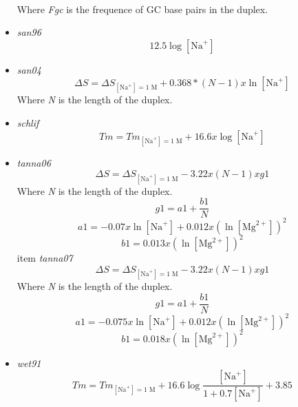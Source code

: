 \documentclass{article}
\begin{document}
\begin{itemize}
\begin{multline*}
 \end{multline*}
 Where \emph{Fgc} is the frequence of GC base pairs in the duplex.
 \item \textit{san96}
 \begin{displaymath}
  12.5  \log [\mbox{Na}^+]   
 \end{displaymath}
 \item \textit{san04}
 \begin{displaymath}
  \Delta{}S=\Delta{}S_{[\mbox{Na}^+]=1\;\mathrm{M}}+ 0.368 * (N - 1) x \ln [\mbox{Na}^+]   
 \end{displaymath}
 Where \emph{N} is the length of the duplex.
 \item \textit{schlif}
 \begin{displaymath}
  Tm=Tm_{[\mbox{Na}^+]=1\;\mathrm{M}}+ 16.6 x \log [\mbox{Na}^+]   
 \end{displaymath}
 \item \textit{tanna06}
 \begin{displaymath}
  \Delta{}S=\Delta{}S_{[\mbox{Na}^+]=1\;\mathrm{M}}- 3.22 x (N - 1) x g1  
 \end{displaymath}
 Where \emph{N} is the length of the duplex.
 \begin{displaymath}
  g1=a1 + \frac{b1}{N}  
 \end{displaymath}
 \begin{displaymath}
  a1= -0.07 x \ln [\mbox{Na}^+] + 0.012 x (\ln [\mbox{Mg}^{2+}])^2  
 \end{displaymath}
 \begin{displaymath}
  b1= 0.013 x (\ln [\mbox{Mg}^{2+}])^2  
 \end{displaymath}
 item \textit{tanna07}
 \begin{displaymath}
  \Delta{}S=\Delta{}S_{[\mbox{Na}^+]=1\;\mathrm{M}}- 3.22 x (N - 1) x g1  
 \end{displaymath}
 Where \emph{N} is the length of the duplex.
 \begin{displaymath}
  g1=a1 + \frac{b1}{N}  
 \end{displaymath}
 \begin{displaymath}
  a1= -0.075 x \ln [\mbox{Na}^+] + 0.012 x (\ln [\mbox{Mg}^{2+}])^2  
 \end{displaymath}
 \begin{displaymath}
  b1= 0.018 x (\ln [\mbox{Mg}^{2+}])^2  
 \end{displaymath}
 \item \textit{wet91}
 \begin{displaymath}
  Tm=Tm_{[\mbox{Na}^+]=1\;\mathrm{M}}+ 16.6  \log \frac{[\mbox{Na}^+]}{1 + 0.7 [\mbox{Na}^+]} + 3.85    
 \end{displaymath}
 \end{itemize}
 
\end{document}
